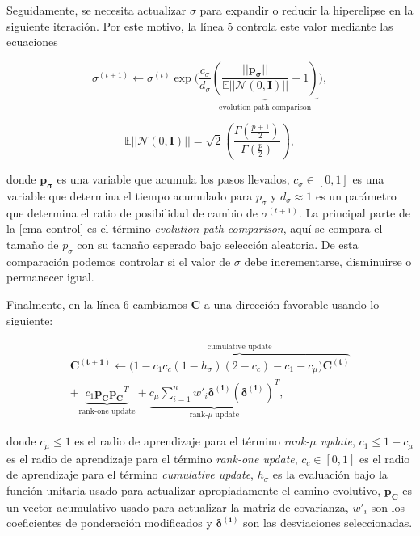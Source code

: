 Seguidamente, se necesita actualizar $\sigma$ para expandir o reducir la
hiperelipse en la siguiente iteración. Por este motivo, la línea 5 controla
este valor mediante las ecuaciones

\begin{equation}
    \sigma^{(t + 1)} \gets \sigma^{(t)} \exp\bigg(\frac{c_{\sigma}}{d_{\sigma}}
    \underbrace{\left(\frac{||\boldsymbol{p_{\sigma}}||}{\mathbb{E}||\mathcal{N}(0,
    \mathbf{I})||} - 1 \right)}_{\text{evolution path comparison}} \bigg),
\label{cma-control}
\end{equation}

\begin{equation}
\mathbb{E}||\mathcal{N}(0, \mathbf{I})|| = \sqrt{2} \left(
  \frac{\Gamma\left(\frac{p + 1}{2}\right)}{\Gamma\left({\frac{p}{2}}\right)}
  \right),
\label{cma-E}
\end{equation}

\noindent donde $\boldsymbol{p_{\sigma}}$ es una variable que acumula los pasos llevados,
$c_{\sigma} \in [0, 1]$ es una variable que determina el tiempo acumulado para $p_{\sigma}$ y 
$d_{\sigma} \approx 1$ es un parámetro que determina el ratio de posibilidad de cambio de $\sigma^{(t + 1)}$. 
La principal parte de la \autoref{cma-control} es el término \emph{evolution path comparison}, 
aquí se compara el tamaño de $p_{\sigma}$ con su tamaño esperado bajo selección
aleatoria.
De esta comparación podemos controlar si el valor de $\sigma$ debe
incrementarse, disminuirse o permanecer igual.

Finalmente, en la línea 6 cambiamos $\boldsymbol{C}$ a una dirección favorable usando lo siguiente:

\begin{multline}
  \boldsymbol{C^{(t + 1)}} \gets \overbrace{\bigg(1 - c_1 c_c (1 - h_{\sigma})(2 - c_c) - c_1 - c_{\mu}\bigg) \boldsymbol{C^{(t)}}}^{\text{cumulative update}} \\
    + \underbrace{c_{1} \boldsymbol{p_{C}} \boldsymbol{p_{C}}^{T}}_{\text{rank-one update}}
    + \underbrace{c_{\mu}\sum_{i=1}^{n}w'_{i}
    \boldsymbol{\delta^{(i)}}\left(\boldsymbol{\delta^{(i)}}\right)^{T}}_{\text{rank-}\mu\text{ update}},
\label{cma-adapt}
\end{multline}

\noindent donde $c_{\mu} \leq 1$ es el radio de aprendizaje para el término \emph{rank-$\mu$ update}, 
$c_1 \leq 1 - c_{\mu}$ es el radio de aprendizaje para el término \emph{rank-one update}, 
$c_c \in [0, 1]$ es el radio de aprendizaje para el término \emph{cumulative update}, 
$h_{\sigma}$ es la evaluación bajo la función unitaria usado para actualizar
apropiadamente el camino evolutivo, 
$\boldsymbol{p_{C}}$ es un vector acumulativo usado para actualizar la matriz de
covarianza, 
$w'_i$ son los coeficientes de ponderación modificados y
$\boldsymbol{\delta^{(i)}}$ son las desviaciones seleccionadas.

